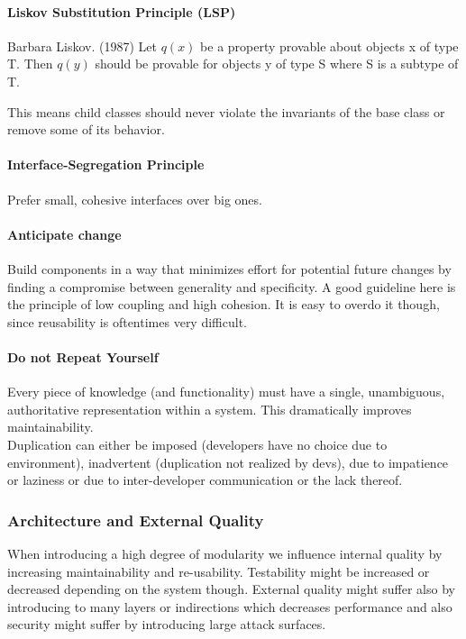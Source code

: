 \paragraph{Liskov Substitution Principle (LSP)}
\begin{chapquote}{Barbara Liskov. (1987)}
    Let $q(x)$ be a property provable about objects x of type T. Then $q(y)$ should
be provable for objects y of type S where S is a subtype of T.
\end{chapquote}
This means child classes should never violate the invariants of the base class or remove some of its behavior.

\paragraph{Interface-Segregation Principle}
Prefer small, cohesive interfaces over big ones.

\paragraph{Anticipate change}
Build components in a way that minimizes effort for potential future changes by finding a compromise between generality and specificity.
A good guideline here is the principle of low coupling and high cohesion.
It is easy to overdo it though, since reusability is oftentimes very difficult.

\paragraph{Do not Repeat Yourself}
Every piece of knowledge (and functionality) must have a single, unambiguous, authoritative representation within a system.
This dramatically improves maintainability.\\
Duplication can either be imposed (developers have no choice due to environment), inadvertent (duplication not realized by devs), due to impatience or laziness or due to inter-developer communication or the lack thereof.

\subsubsection{Architecture and External Quality}
When introducing a high degree of modularity we influence internal quality by increasing maintainability and re-usability.
Testability might be increased or decreased depending on the system though.
External quality might suffer also by introducing to many layers or indirections
which decreases performance and also security might suffer by introducing large attack surfaces.\\

